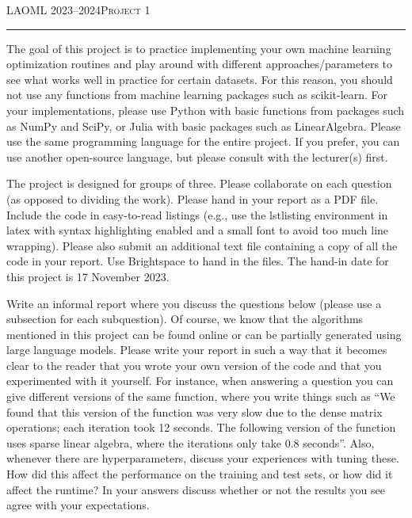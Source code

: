\documentclass[11pt,noanswers]{exam}
\begin{document}
\noindent\textsc{\Large LAOML 2023--2024\hfill Project 1}\\\hrule
\vspace*{.5cm}


The goal of this project is to practice implementing your own machine learning optimization routines and play around with different approaches/parameters to see what works well in practice for certain datasets. For this reason, you should not use any functions from machine learning packages such as scikit-learn. For your implementations, please use Python with basic functions from packages such as NumPy and SciPy, or Julia with basic packages such as LinearAlgebra. Please use the same programming language for the entire project. If you prefer, you can use another open-source language, but please consult with the lecturer(s) first.

The project is designed for groups of three. Please collaborate on each question (as opposed to dividing the work). Please hand in your report as a PDF file. Include the code in easy-to-read listings (e.g., use the lstlisting environment in latex with syntax highlighting enabled and a small font to avoid too much line wrapping). Please also submit an additional text file containing a copy of all the code in your report. Use Brightspace to hand in the files. The hand-in date for this project is 17 November 2023.

Write an informal report where you discuss the questions below (please use a subsection for each subquestion). Of course, we know that the algorithms mentioned in this project can be found online or can be partially generated using large language models. Please write your report in such a way that it becomes clear to the reader that you wrote your own version of the code and that you experimented with it yourself. For instance, when answering a question you can give different versions of the same function, where you write things such as ``We found that this version of the function was very slow due to the dense matrix operations; each iteration took 12 seconds. The following version of the function uses sparse linear algebra, where the iterations only take 0.8 seconds''. Also, whenever there are hyperparameters, discuss your experiences with tuning these. How did this affect the performance on the training and test sets, or how did it affect the runtime? In your answers discuss whether or not the results you see agree with your expectations.
\end{document}
